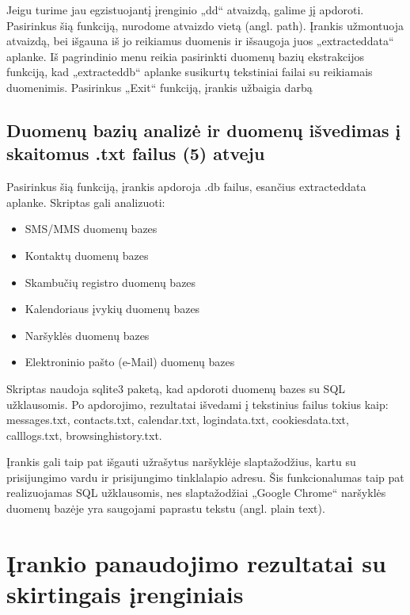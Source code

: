 \documentclass[a4paper,12pt,fleqn]{article}
\begin{document}
Jeigu turime jau egzistuojantį įrenginio „dd“ atvaizdą, galime jį apdoroti. Pasirinkus šią funkciją, nurodome atvaizdo vietą (angl. path). Įrankis užmontuoja atvaizdą, bei išgauna iš jo reikiamus duomenis ir išsaugoja juos „extracted\textunderscore data“ aplanke.  Iš pagrindinio menu reikia pasirinkti duomenų bazių ekstrakcijos funkciją, kad „extracted\textunderscore db“ aplanke susikurtų tekstiniai failai su reikiamais duomenimis. Pasirinkus „Exit“ funkciją, įrankis užbaigia darbą

\subsection{Duomenų bazių analizė ir duomenų išvedimas į skaitomus .txt failus (5) atveju}

Pasirinkus šią funkciją, įrankis apdoroja .db failus, esančius extracted\textunderscore data aplanke. Skriptas gali analizuoti:
\begin{itemize}
 \setlength{\itemsep}{1pt}
  \setlength{\parskip}{0pt}
  \setlength{\parsep}{0pt}
    \item  SMS/MMS duomenų bazes
    \item  Kontaktų duomenų bazes
    \item  Skambučių registro duomenų bazes
    \item  Kalendoriaus įvykių duomenų bazes
    \item  Naršyklės duomenų bazes
    \item  Elektroninio pašto (e-Mail) duomenų bazes
\end{itemize}
Skriptas naudoja sqlite3 paketą, kad apdoroti duomenų bazes su SQL užklausomis. Po apdorojimo, rezultatai išvedami į tekstinius failus tokius kaip: messages.txt, contacts.txt, calendar.txt, login\textunderscore data.txt, cookies\textunderscore data.txt, call\textunderscore logs.txt, browsing\textunderscore history.txt.

Įrankis gali taip pat išgauti užrašytus naršyklėje slaptažodžius, kartu su prisijungimo vardu ir prisijungimo tinklalapio adresu. Šis funkcionalumas taip pat realizuojamas SQL užklausomis, nes slaptažodžiai „Google Chrome“ naršyklės duomenų bazėje yra saugojami paprastu tekstu (angl. plain text).
\clearpage
\section{Įrankio panaudojimo rezultatai su skirtingais įrenginiais}
\end{document}
